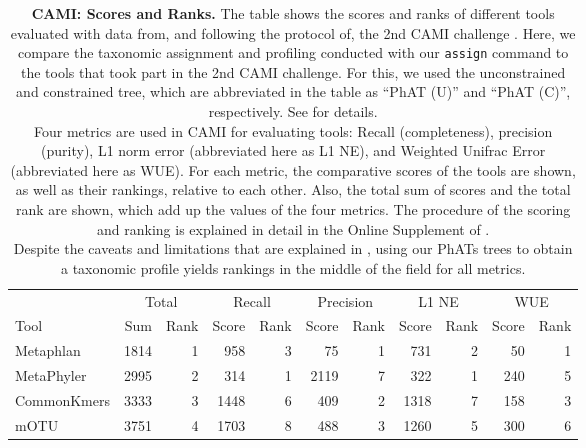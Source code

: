 \begin{table}[htb]
\caption{
\textbf{CAMI: Scores and Ranks.}
The table shows the scores and ranks of different tools evaluated with data from, and following the protocol of,
the 2nd CAMI challenge \citep{Sczyrba2017,Bremges2018}.
Here, we compare the taxonomic assignment and profiling conducted with our \texttt{assign} command
to the tools that took part in the 2nd CAMI challenge.
For this, we used the unconstrained and constrained  tree,
which are abbreviated in the table as ``PhAT (U)'' and ``PhAT (C)'', respectively.
See  for details.
\\
Four metrics are used in CAMI for evaluating tools:
Recall (completeness), precision (purity), L1 norm error (abbreviated here as L1 NE),
and Weighted Unifrac Error (abbreviated here as WUE).
For each metric, the comparative scores of the tools are shown, as well as their rankings, relative to each other.
Also, the total sum of scores and the total rank are shown, which add up the values of the four metrics.
The procedure of the scoring and ranking is explained in detail in the Online Supplement of \cite{Sczyrba2017}.
\\
Despite the caveats and limitations that are explained in ,
using our \acp{PhAT} trees to obtain a taxonomic profile yields rankings in the middle of the field for all metrics.
}
\label{tab:cami_rankings}
{
    \begin{center}
    \begin{tabular}{lrrrrrrrrrr}
        \toprule
                       & \multicolumn{2}{c}{Total} & \multicolumn{2}{c}{Recall} & \multicolumn{2}{c}{Precision} & \multicolumn{2}{c}{L1 NE} & \multicolumn{2}{c}{WUE} \\
        Tool           & Sum & Rank & Score & Rank & Score & Rank & Score & Rank & Score & Rank \\
        \midrule
        Metaphlan           &   1814    &   1   &   958     &   3   &  75       &   1   &  731      &   2   & 50    &   1   \\
        MetaPhyler          &   2995    &   2   &   314     &   1   &  2119     &   7   &  322      &   1   & 240   &   5   \\
        CommonKmers         &   3333    &   3   &   1448    &   6   &  409      &   2   &  1318     &   7   & 158   &   3   \\
        mOTU                &   3751    &   4   &   1703    &   8   &  488      &   3   &  1260     &   5   & 300   &   6   \\

\end{tabular}
\end{center}}
\end{table}
